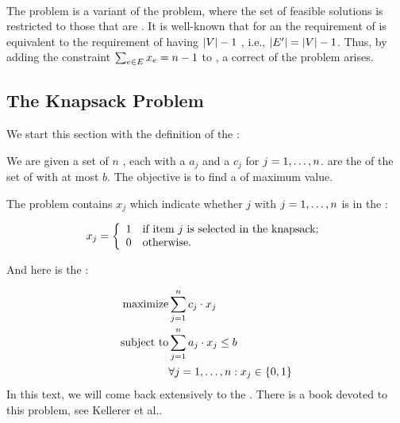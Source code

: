 \paragraph{}
The  problem is a variant of the  problem, where the set of feasible solutions is restricted to those  that are . It is well-known that for an  the requirement of  is equivalent to the requirement of having $\abs{V}-1$ , i.e., $\abs{E'}=\abs{V}-1$. Thus, by adding the constraint $\isumdomain[e]{E}{x_e}=n-1$ to , a correct  of the  problem arises.

\subsection{The Knapsack Problem}

We start this section with the definition of the :

\begin{definition}
We are given a set of $n$ , each with a  $a_j$ and a  $c_j$ for $\rangei[j]{1}{n}$.  are the  of the set of  with  at most $b$. The objective is to find a  of maximum value.
\end{definition}

The problem  contains  $x_j$ which indicate whether  $j$ with $\rangei[j]{1}{n}$ is in the :

\begin{equation}
\semboolvar{x_j}{if item $j$ is selected in the knapsack;}{otherwise.}
\end{equation}

And here is the :

\begin{eqnarray}
\mbox{maximize}&\sumieqb[j]{1}{n}{c_j\cdot x_j}\eqnlab{knapsack-m}\\
\mbox{subject to}&\sumieqb[j]{1}{n}{a_j\cdot x_j}\leq b\eqnlab{knapsack-c1}\\
&\forall\rangei[j]{1}{n}:x_j\in\accl{0,1}\eqnlab{knapsack-c2}
\end{eqnarray}
In this text, we will come back extensively to the . There is a book devoted to this problem, see Kellerer et al.\cite{KelPfePis04}.


